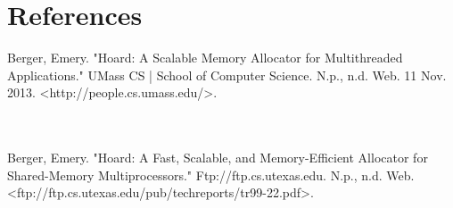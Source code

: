 \documentclass[11pt]{article}
\begin{document}
\newpage
\noindent
\section{References}

Berger, Emery. "Hoard: A Scalable Memory Allocator for Multithreaded Applications." UMass CS | School of Computer Science. N.p., n.d. Web. 11 Nov. 2013. <http://people.cs.umass.edu/>.

\\
\\
Berger, Emery. "Hoard: A Fast, Scalable, and Memory-Efficient Allocator for Shared-Memory Multiprocessors." Ftp://ftp.cs.utexas.edu. N.p., n.d. Web. <ftp://ftp.cs.utexas.edu/pub/techreports/tr99-22.pdf>.

\end{document}

